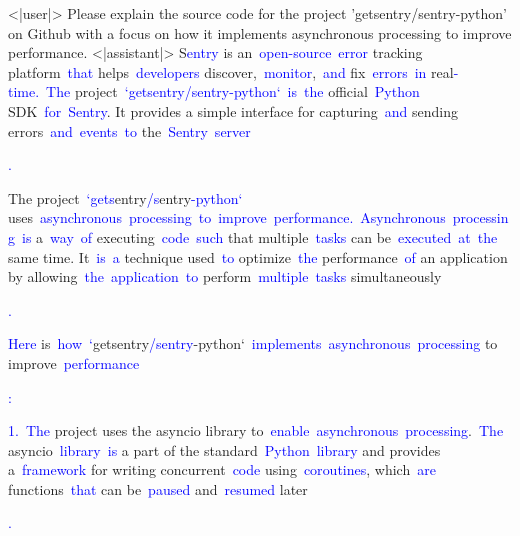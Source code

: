\documentclass{article}
\begin{document}
\begin{tcolorbox}[colframe=black,colback=white]
<|user|>
Please explain the source code for the project 'getsentry/sentry-python' on Github with a focus on how it implements asynchronous processing to improve performance.
<|assistant|>
S\textcolor{blue}{entry} is an\textcolor{blue}{~open}\textcolor{blue}{-source}\textcolor{blue}{~error} tracking platform\textcolor{blue}{~that} helps\textcolor{blue}{~developers} discover,\textcolor{blue}{~monitor},\textcolor{blue}{~and} fix\textcolor{blue}{~errors}\textcolor{blue}{~in} real\textcolor{blue}{-time}\textcolor{blue}{.}\textcolor{blue}{~The} project\textcolor{blue}{~`}\textcolor{blue}{gets}\textcolor{blue}{entry}\textcolor{blue}{/s}\textcolor{blue}{entry}\textcolor{blue}{-python}\textcolor{blue}{`}\textcolor{blue}{~is}\textcolor{blue}{~the} official\textcolor{blue}{~Python} SDK\textcolor{blue}{~for}\textcolor{blue}{~Sentry}. It provides a simple interface for capturing\textcolor{blue}{~and} sending errors\textcolor{blue}{~and}\textcolor{blue}{~events}\textcolor{blue}{~to} the\textcolor{blue}{~Sentry}\textcolor{blue}{~server}\textcolor{blue}{.

}The project\textcolor{blue}{~`}\textcolor{blue}{gets}entry\textcolor{blue}{/s}entry\textcolor{blue}{-python}\textcolor{blue}{`} uses\textcolor{blue}{~asynchronous}\textcolor{blue}{~processing}\textcolor{blue}{~to}\textcolor{blue}{~improve}\textcolor{blue}{~performance}\textcolor{blue}{.}\textcolor{blue}{~As}\textcolor{blue}{ynchronous}\textcolor{blue}{~processing}\textcolor{blue}{~is} a\textcolor{blue}{~way}\textcolor{blue}{~of} executing\textcolor{blue}{~code}\textcolor{blue}{~such} that multiple\textcolor{blue}{~tasks} can be\textcolor{blue}{~executed}\textcolor{blue}{~at}\textcolor{blue}{~the} same time. It\textcolor{blue}{~is}\textcolor{blue}{~a} technique used\textcolor{blue}{~to} optimize\textcolor{blue}{~the} performance\textcolor{blue}{~of} an application by allowing\textcolor{blue}{~the}\textcolor{blue}{~application}\textcolor{blue}{~to} perform\textcolor{blue}{~multiple}\textcolor{blue}{~tasks} simultaneously\textcolor{blue}{.

}\textcolor{blue}{Here} is\textcolor{blue}{~how}\textcolor{blue}{~`}getsentry\textcolor{blue}{/s}\textcolor{blue}{entry}-python`\textcolor{blue}{~implements}\textcolor{blue}{~asynchronous}\textcolor{blue}{~processing} to improve\textcolor{blue}{~performance}\textcolor{blue}{:

}\textcolor{blue}{1}\textcolor{blue}{.}\textcolor{blue}{~The} project uses the asyncio library to\textcolor{blue}{~enable}\textcolor{blue}{~asynchronous}\textcolor{blue}{~processing}.\textcolor{blue}{~The} asyncio\textcolor{blue}{~library}\textcolor{blue}{~is} a part of the standard\textcolor{blue}{~Python}\textcolor{blue}{~library} and provides a\textcolor{blue}{~framework} for writing concurrent\textcolor{blue}{~code} using\textcolor{blue}{~cor}\textcolor{blue}{outines}, which\textcolor{blue}{~are} functions\textcolor{blue}{~that} can be\textcolor{blue}{~paused} and\textcolor{blue}{~resumed} later\textcolor{blue}{.

}
\end{tcolorbox}
\end{document}

